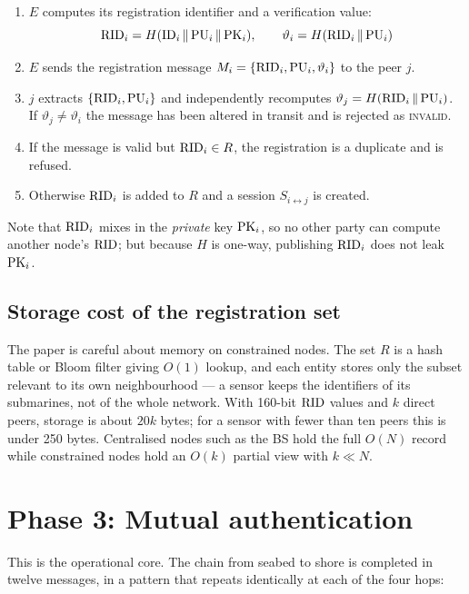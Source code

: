 \begin{enumerate}
\item $E$ computes its registration identifier and a verification value:
      \begin{equation}
      \mathrm{RID}_i = H(\mathrm{ID}_i \,\|\, \mathrm{PU}_i \,\|\, \mathrm{PK}_i), \qquad
      \vartheta_i = H(\mathrm{RID}_i \,\|\, \mathrm{PU}_i)
      \end{equation}
\item $E$ sends the registration message $M_i = \{\mathrm{RID}_i, \mathrm{PU}_i, \vartheta_i\}$ to the peer
      $j$.
\item $j$ extracts $\{\mathrm{RID}_i, \mathrm{PU}_i\}$ and independently recomputes
      $\vartheta_j = H(\mathrm{RID}_i \,\|\, \mathrm{PU}_i)$. If $\vartheta_j \neq \vartheta_i$ the message
      has been altered in transit and is rejected as \textsc{invalid}.
\item If the message is valid but $\mathrm{RID}_i \in R$, the registration is a duplicate and is
      refused.
\item Otherwise $\mathrm{RID}_i$ is added to $R$ and a session $S_{i\leftrightarrow j}$ is created.
\end{enumerate}

Note that $\mathrm{RID}_i$ mixes in the \emph{private} key $\mathrm{PK}_i$, so no other party can compute
another node's $\mathrm{RID}$; but because $H$ is one-way, publishing $\mathrm{RID}_i$ does not leak
$\mathrm{PK}_i$.

\subsection{Storage cost of the registration set}

The paper is careful about memory on constrained nodes. The set $R$ is a hash table or Bloom
filter giving $O(1)$ lookup, and each entity stores only the subset relevant to its own
neighbourhood --- a sensor keeps the identifiers of its submarines, not of the whole
network. With 160-bit $\mathrm{RID}$ values and $k$ direct peers, storage is about $20k$ bytes; for
a sensor with fewer than ten peers this is under 250 bytes. Centralised nodes such as the BS
hold the full $O(N)$ record while constrained nodes hold an $O(k)$ partial view with
$k \ll N$.

\section{Phase 3: Mutual authentication}

This is the operational core. The chain from seabed to shore is completed in twelve
messages, in a pattern that repeats identically at each of the four hops:

